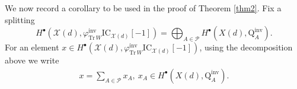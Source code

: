 \documentclass [11pt,oneside,a4paper,mathscr]{amsart}
\newtheorem{cor}[thm]{Corollary}
\theoremstyle{definition}
\renewcommand{\leq}{\leqslant}
\renewcommand{\geq}{\geqslant}
\newcommand{\X}{\mathscr{X}}
\begin{document}
We now record a corollary to be used in the proof of Theorem \ref{thm2}.
Fix a splitting 
\begin{equation}\label{xa}
H^\bullet\left(\X(d), \varphi^{\mathrm{inv}}_{\mathrm{Tr}\,W}\mathrm{IC}_{\X(d)}[-1]\right)=\bigoplus_{A\in\mathscr{P}}H^\bullet(X(d), \mathrm{Q}^{\mathrm{inv}}_A).
\end{equation}
For an element $x\in H^\bullet\left(\X(d), \varphi^{\mathrm{inv}}_{\mathrm{Tr}\,W}\mathrm{IC}_{\X(d)}[-1]\right)$, using the decomposition above we write 
\begin{align}\label{xa2}
x=\sum_{A\in\mathscr{P}}x_A, \ x_A\in H^\bullet(X(d), \mathrm{Q}^{\mathrm{inv}}_A). 
\end{align}


%
%
%
%
\end{document}
